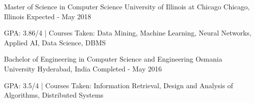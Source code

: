 \vspace{-1mm}
\vspace{-2mm}
\begin{cventries}
  \cventry
    {Master of Science in Computer Science}
    {University of Illinois at Chicago\vspace{-2mm}}
    {Chicago, Illinois\vspace{-2mm}}
    {Expected - May 2018}
    {
      \begin{cvitems}
      \vspace{-2mm}
        \item {GPA: 3.86/4 | Courses Taken: Data Mining, Machine Learning, Neural Networks, Applied AI, Data Science, DBMS\vspace{-2mm}}
      \end{cvitems}
    }
    \cventry
    {Bachelor of Engineering in Computer Science and Engineering}
    {\vspace{3mm}Osmania University\vspace{-5mm}}
    {\vspace{3mm}Hyderabad, India\vspace{-5mm}}
    {Completed - May 2016}
    {
      \begin{cvitems}
        \item {GPA: 3.5/4 | Courses Taken: Information Retrieval, Design and Analysis of Algorithms, Distributed Systems}
      \end{cvitems}
    }
\end{cventries}
